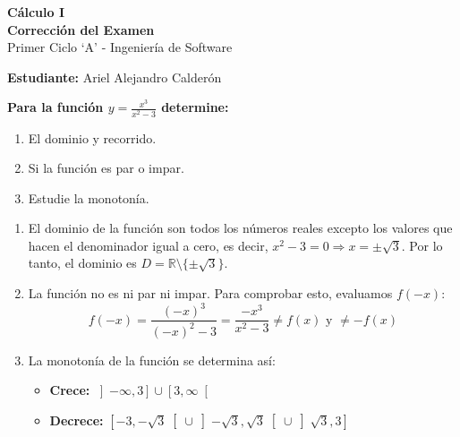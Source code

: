 \documentclass[answers]{exam} %
\begin{document}
\begin{center}
	\Large\textbf{Cálculo I}\\[1em]
	\large\textbf{Corrección del Examen}\\[1em]
	\large Primer Ciclo \enquote*{A} - Ingeniería de Software\\[1em]
\end{center}

\vspace{0.5cm}
\large\textbf{Estudiante:} Ariel Alejandro Calderón
\vspace{0.5cm}

\begin{questions}

	\question \large\textbf{Para la función $\displaystyle y = \frac{x^3}{x^2 - 3} $ determine:}
	\begin{enumerate}[label=\alph*.]
		\item El dominio y recorrido.
		\item Si la función es par o impar.
		\item Estudie la monotonía.
	\end{enumerate}
	\begin{solution}
		\begin{enumerate}[label=\alph*.]
			\item El dominio de la función son todos los números reales excepto los valores que hacen el denominador igual a cero, es decir, $x^2 - 3 = 0 \Rightarrow x = \pm\sqrt{3}$. Por lo tanto, el dominio es $D = \mathbb{R} \setminus \{\pm\sqrt{3}\}$.

			\item La función no es ni par ni impar. Para comprobar esto, evaluamos $f(-x)$:
			      \[
				      f(-x) = \frac{(-x)^3}{(-x)^2 - 3} = \frac{-x^3}{x^2 - 3} \neq f(x) \text{ y } \neq -f(x)
			      \]

			\item La monotonía de la función se determina así:
			      \begin{itemize}
				      \item \normalsize\textbf{Crece:} $\displaystyle \left]-\infty, 3\right]\cup \left[3, \infty\right[$
				      \item \normalsize\textbf{Decrece:} $\displaystyle \left[-3, -\sqrt{3}\right[\cup \left]-\sqrt{3}, \sqrt{3}\right[\cup \left]\sqrt{3}, 3\right]$
			      \end{itemize}
		\end{enumerate}


\end{solution}
\end{questions}
\end{document}

